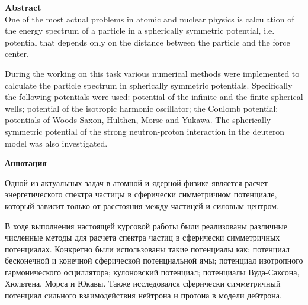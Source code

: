 \documentclass[a4paper, 12pt]{article}
\begin{document}
\textbf{Abstract}\\

One of the most actual problems in atomic and nuclear physics is calculation of the energy spectrum of a particle in a spherically symmetric potential, i.e. potential that depends only on the distance between the particle and the force center.

During the working on this task various numerical methods were implemented to calculate the particle spectrum in spherically symmetric potentials. Specifically the following potentials were used: potential of the infinite and the finite spherical wells; potential of the isotropic harmonic oscillator; the Coulomb potential; potentials of Woods-Saxon, Hulthen, Morse and Yukawa. The spherically symmetric potential of the strong neutron-proton interaction in the deuteron model was also investigated.

\textbf{Аннотация}

Одной из актуальных задач в атомной и ядерной физике является расчет энергетического спектра частицы в сферически симметричном потенциале, который зависит только от расстояния между частицей и силовым центром.

В ходе выполнения настоящей курсовой работы были реализованы различные численные методы для расчета спектра частиц в сферически симметричных потенциалах. Конкретно были использованы такие потенциалы как: потенциал бесконечной и конечной сферической потенциальной ямы; потенциал изотропного гармонического осциллятора; кулоновский потенциал; потенциалы Вуда-Саксона, Хюльтена, Морса и Юкавы. Также исследовался сферически симметричный потенциал сильного взаимодействия нейтрона и протона в модели дейтрона.
\end{document}
